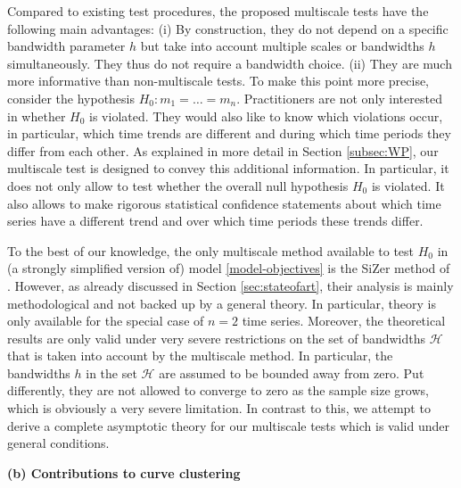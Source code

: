 \documentclass[a4paper,12pt]{article}
\begin{document}
Compared to existing test procedures, the proposed multiscale tests have the following main advantages: (i) By construction, they do not depend on a specific bandwidth para\-meter $h$ but take into account multiple scales or bandwidths $h$ simultaneously. They thus do not require a bandwidth choice. (ii) They are much more informative than non-multiscale tests. To make this point more precise, consider the hypothesis $H_0: m_1 = \ldots = m_n$. Practitioners are not only interested in whether $H_0$ is violated. They would also like to know which violations occur, in particular, which time trends are different and during which time periods they differ from each other. As explained in more detail in Section \ref{subsec:WP}, our multiscale test is designed to convey this additional information. In particular, it does not only allow to test whether the overall null hypothesis $H_0$ is violated. It also allows to make rigorous statistical confidence statements about which time series have a different trend and over which time periods these trends differ. 


To the best of our knowledge, the only multiscale method available to test $H_0$ in (a strongly simplified version of) model \eqref{model-objectives} is the SiZer method of \cite{Park2009}. However, as already discussed in Section \ref{sec:stateofart}, their analysis is mainly methodological and not backed up by a general theory. In particular, theory is only available for the special case of $n=2$ time series. Moreover, the theoretical results are only valid under very severe restrictions on the set of bandwidths $\mathcal{H}$ that is taken into account by the multiscale method. In particular, the bandwidths $h$ in the set $\mathcal{H}$ are assumed to be bounded away from zero. Put differently, they are not allowed to converge to zero as the sample size grows, which is obviously a very severe limitation. In contrast to this, we attempt to derive a complete asymptotic theory for our multiscale tests which is valid under general conditions. 
\vspace{10pt}


\noindent \textbf{(b) Contributions to curve clustering} 
\vspace{10pt} 
\end{document}
